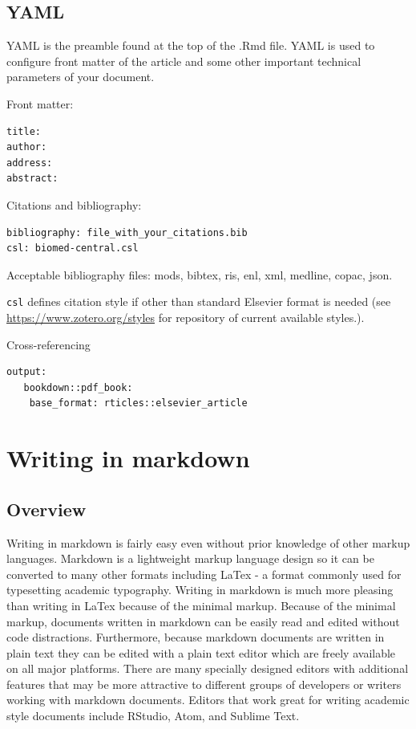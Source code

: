 \documentclass[]{book}
\begin{document}
\subsection{YAML}\label{yaml}

YAML is the preamble found at the top of the .Rmd file. YAML is used to
configure front matter of the article and some other important technical
parameters of your document.

Front matter:

\begin{verbatim}
title:
author:
address:
abstract:
\end{verbatim}

Citations and bibliography:

\begin{verbatim}
bibliography: file_with_your_citations.bib
csl: biomed-central.csl
\end{verbatim}

Acceptable bibliography files: mods, bibtex, ris, enl, xml, medline,
copac, json.

\texttt{csl} defines citation style if other than standard Elsevier
format is needed (see \url{https://www.zotero.org/styles} for repository
of current available styles.).

Cross-referencing

\begin{verbatim}
output:
   bookdown::pdf_book:
    base_format: rticles::elsevier_article
\end{verbatim}

\section{Writing in markdown}\label{writing-in-markdown}

\subsection{Overview}\label{overview}

Writing in markdown is fairly easy even without prior knowledge of other
markup languages. Markdown is a lightweight markup language design so it
can be converted to many other formats including LaTex - a format
commonly used for typesetting academic typography. Writing in markdown
is much more pleasing than writing in LaTex because of the minimal
markup. Because of the minimal markup, documents written in markdown can
be easily read and edited without code distractions. Furthermore,
because markdown documents are written in plain text they can be edited
with a plain text editor which are freely available on all major
platforms. There are many specially designed editors with additional
features that may be more attractive to different groups of developers
or writers working with markdown documents. Editors that work great for
writing academic style documents include RStudio, Atom, and Sublime
Text.
\end{document}
